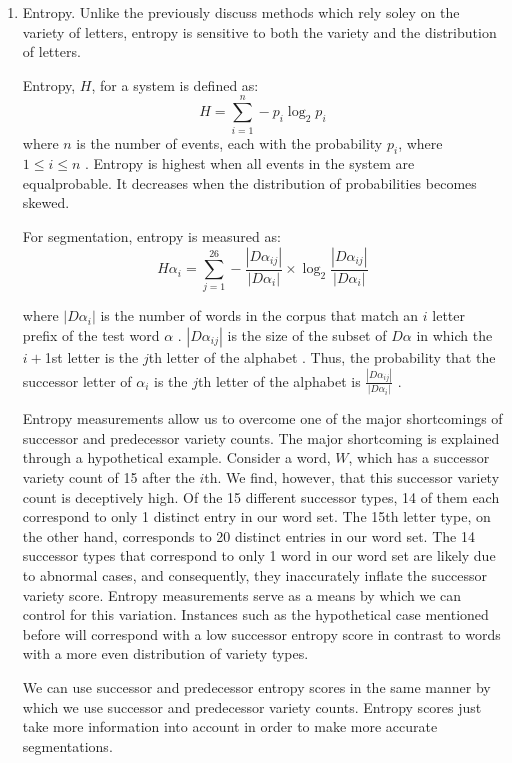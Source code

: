 \documentclass[11pt,letterpaper]{article}
\begin{document}
\begin{enumerate}
\item Entropy. Unlike the previously discuss methods which rely soley on the variety of letters, entropy is sensitive to both the variety and the distribution of letters.\par

Entropy, \(H\), for a system is defined as: 
$$H = \sum\limits_{i=1}^n - p_{i} \log_2 p_{i}$$
where \( n \) is the number of events, each with the probability \(p_{i}\), where \(1 \leq i \leq n\) \cite{hafer1974-word}. Entropy is highest when all events in the system are equalprobable. It decreases when the distribution of probabilities becomes skewed.\par

For segmentation, entropy is measured as:
$$H\alpha_{i} = \sum\limits_{j=1}^{26} - \frac{|D\alpha_{ij}|}{|D\alpha_{i}|} \times \log_2\frac{|D\alpha_{ij}|}{|D\alpha_{i}|}$$

where \(|D\alpha_{i}|\) is the number of words in the corpus that match an \(i\) letter prefix of the test word \(\alpha\) \cite{hafer1974-word}. \(|D \alpha_{ij}|\) is the size of the subset of \(D\alpha\) in which the \(i + \)1st letter is the \(j\)th letter of the alphabet \cite{hafer1974-word}. Thus, the probability that the successor letter of \(\alpha_{i}\) is the \(j\)th letter of the alphabet is \(\frac{|D\alpha_{ij}|}{|D\alpha_{i}|}\) \cite{hafer1974-word}. \par

Entropy measurements allow us to overcome one of the major shortcomings of successor and predecessor variety counts. The major shortcoming is explained through a hypothetical example. Consider a word, $W$, which has a successor variety count of 15 after the $i$th. We find, however, that this successor variety count is deceptively high. Of the 15 different successor types, 14 of them each correspond to only 1 distinct entry in our word set. The 15th letter type, on the other hand, corresponds to 20 distinct entries in our word set. The 14 successor types that correspond to only 1 word in our word set are likely due to abnormal cases, and consequently, they inaccurately inflate the successor variety score. Entropy measurements serve as a means by which we can control for this variation. Instances such as the hypothetical case mentioned before will correspond with a low successor entropy score in contrast to words with a more even distribution of variety types.

We can use successor and predecessor entropy scores in the same manner by which we use successor and predecessor variety counts. Entropy scores just take more information into account in order to make more accurate segmentations.
\end{enumerate}
\end{document}
